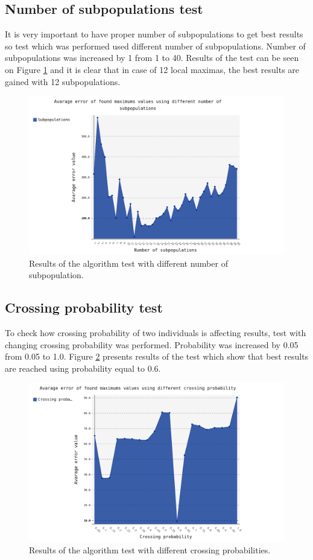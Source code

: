 \documentclass[a4paper]{article}
\begin{document}
\subsection{Number of subpopulations test}
It is very important to have proper number of subpopulations to get best results so test which was performed used different number of subpopulations. Number of subpopulations was 
increased by 1 from 1 to 40. Results of the test can be seen on Figure \ref{subpopulations}
 and it is clear that in case of 12 local maximas, the best results are gained with 12 subpopulations.
\vfill
\begin{figure}[ht]
	\centering
	\includegraphics[scale=0.36,keepaspectratio=true]{subpopulation.png}	
	\caption{Results of the algorithm test with different number of subpopulation.}
	\label{subpopulations}
\end{figure}
\vfill
\clearpage

\subsection{Crossing probability test}
To check how crossing probability of two individuals is affecting results, test with changing crossing probability was performed. 
Probability was increased by 0.05 from 0.05 to 1.0. Figure \ref{crossing} presents results of the test which show that best results are reached using probability equal to 0.6.
\vfill
\begin{figure}[ht]
	\centering
	\includegraphics[scale=0.36,keepaspectratio=true]{crossing.png}	
	\caption{Results of the algorithm test with different crossing probabilities.}
	\label{crossing}
\end{figure}
\vfill
\clearpage
\end{document}
